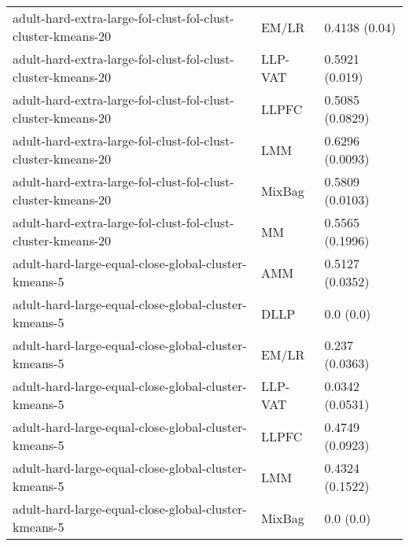 \begin{longtable}{lll}
                                                 adult-hard-extra-large-fol-clust-fol-clust-cluster-kmeans-20 &     EM/LR &                         0.4138 (0.04) \\
                                                 adult-hard-extra-large-fol-clust-fol-clust-cluster-kmeans-20 &   LLP-VAT &                        0.5921 (0.019) \\
                                                 adult-hard-extra-large-fol-clust-fol-clust-cluster-kmeans-20 &     LLPFC &                       0.5085 (0.0829) \\
                                                 adult-hard-extra-large-fol-clust-fol-clust-cluster-kmeans-20 &       LMM &                       0.6296 (0.0093) \\
                                                 adult-hard-extra-large-fol-clust-fol-clust-cluster-kmeans-20 &    MixBag &                       0.5809 (0.0103) \\
                                                 adult-hard-extra-large-fol-clust-fol-clust-cluster-kmeans-20 &        MM &                       0.5565 (0.1996) \\
                                                         adult-hard-large-equal-close-global-cluster-kmeans-5 &       AMM &                       0.5127 (0.0352) \\
                                                         adult-hard-large-equal-close-global-cluster-kmeans-5 &      DLLP &                             0.0 (0.0) \\
                                                         adult-hard-large-equal-close-global-cluster-kmeans-5 &     EM/LR &                        0.237 (0.0363) \\
                                                         adult-hard-large-equal-close-global-cluster-kmeans-5 &   LLP-VAT &                       0.0342 (0.0531) \\
                                                         adult-hard-large-equal-close-global-cluster-kmeans-5 &     LLPFC &                       0.4749 (0.0923) \\
                                                         adult-hard-large-equal-close-global-cluster-kmeans-5 &       LMM &                       0.4324 (0.1522) \\
                                                         adult-hard-large-equal-close-global-cluster-kmeans-5 &    MixBag &                             0.0 (0.0) \\

\end{longtable}
